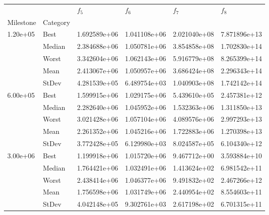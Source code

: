 \begin{tabular}{llllll}
\toprule
         &      &      $f_{5}$ &      $f_{6}$ &      $f_{7}$ &      $f_{8}$ \\
Milestone & Category &              &              &              &              \\
\midrule
\multirow{5}{*}{1.20e+05} & Best & 1.692589e+06 & 1.041108e+06 & 2.021040e+08 & 7.871896e+13 \\
         & Median & 2.384688e+06 & 1.050781e+06 & 3.854858e+08 & 1.702830e+14 \\
         & Worst & 3.342604e+06 & 1.062143e+06 & 5.916779e+08 & 8.265399e+14 \\
         & Mean & 2.413067e+06 & 1.050957e+06 & 3.686424e+08 & 2.296343e+14 \\
         & StDev & 4.281539e+05 & 6.489754e+03 & 1.040903e+08 & 1.742142e+14 \\
\cline{1-6}
\multirow{5}{*}{6.00e+05} & Best & 1.599915e+06 & 1.029175e+06 & 5.439610e+05 & 2.457381e+12 \\
         & Median & 2.282640e+06 & 1.045952e+06 & 1.532363e+06 & 1.311850e+13 \\
         & Worst & 3.021428e+06 & 1.057104e+06 & 4.089576e+06 & 2.997293e+13 \\
         & Mean & 2.261352e+06 & 1.045216e+06 & 1.722883e+06 & 1.270398e+13 \\
         & StDev & 3.772428e+05 & 6.129980e+03 & 8.024587e+05 & 6.104340e+12 \\
\cline{1-6}
\multirow{5}{*}{3.00e+06} & Best & 1.199918e+06 & 1.015720e+06 & 9.467712e+00 & 3.593884e+10 \\
         & Median & 1.764421e+06 & 1.032491e+06 & 1.413624e+02 & 6.981542e+11 \\
         & Worst & 2.438414e+06 & 1.046377e+06 & 9.491832e+02 & 2.467266e+12 \\
         & Mean & 1.756598e+06 & 1.031749e+06 & 2.440954e+02 & 8.554603e+11 \\
         & StDev & 4.042148e+05 & 9.302761e+03 & 2.617198e+02 & 6.701315e+11 \\
\bottomrule
\end{tabular}
